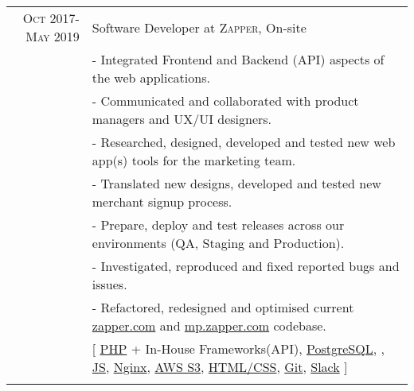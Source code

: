 \documentclass[a4paper,10pt]{article} %
\begin{document}
\begin{tabular}{r|p{15cm}}
\textsc{Oct 2017-May 2019} & Software Developer at \textsc{Zapper}, On-site \emph{}\\
& \footnotesize{- Integrated Frontend and Backend (API) aspects of the web applications.}\\
& \footnotesize{- Communicated and collaborated with product managers and UX/UI designers.}\\
& \footnotesize{- Researched, designed, developed and tested new web app(s) tools for the marketing team.}\\
& \footnotesize{- Translated new designs, developed and tested new merchant signup process.}\\
& \footnotesize{- Prepare, deploy and test releases across our environments (QA, Staging and Production).}\\
& \footnotesize{- Investigated, reproduced and fixed reported bugs and issues.}\\
& \footnotesize{- Refactored, redesigned and optimised current \href{https://zapper.com}{zapper.com} and \href{https://mp.zapper.com/}{mp.zapper.com} codebase.}\\
& \footnotesize{[ \href{https://www.php.net/}{PHP} + In-House Frameworks(API), \href{https://www.postgresql.org/}{PostgreSQL}, \href{}{}, \href{https://developer.mozilla.org/en-US/docs/Web/JavaScript}{JS}, \href{https://nginx.org/en/}{Nginx}, \href{https://aws.amazon.com/s3/}{AWS S3}, \href{https://datatracker.ietf.org/doc/html/rfc7993}{HTML/CSS}, \href{https://git-scm.com/}{Git}, \href{https://slack.com/}{Slack} ]}\\
\multicolumn{2}{c}{} \\



\end{tabular}
\end{document}
